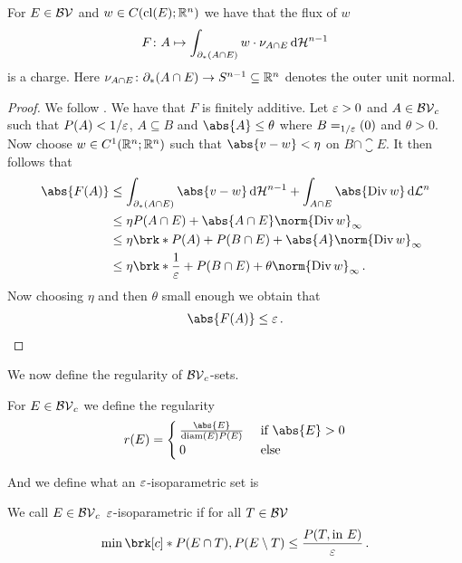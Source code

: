 \begin{claim}
For $E\in\mathcal{BV}$  and $w\in C(\operatorname{cl}(E);\mathbb{R}^n)$ we have that the flux of $w$
\begin{align*}
	F\colon A\mapsto \int_{\partial_*(A\cap E)}w\cdot\nu_{A\cap E}\,\mathrm{d} \mathcal{H}^{n-1}
\end{align*}
is a charge. Here $\nu_{A\cap E}\colon \partial_*(A\cap E)\to S^{n-1}\subseteq\mathbb{R}^n$ denotes the outer unit normal.
\end{claim}
\begin{proof}
We follow \cite[Example 2.1.4]{Pfe2001}.
We have that $F$ is finitely additive. Let $\varepsilon>0$ and $A\in\mathcal{BV}_c$ such that $P(A)<1/\varepsilon$, $A\subseteq B$ and $\abs{A}\leq \theta$ where $B=_{1/\varepsilon}(0)$ and $\theta>0$. Now choose $w\in C^1(\mathbb{R}^n;\mathbb{R}^n)$ such that $\abs{v-w}<\eta$ on $B\cap\closure E$. It then follows that
\begin{align*}
	\abs{F(A)}
	&\leq \int_{\partial_*(A\cap E)}\abs{v-w}\dif\cH^{n-1}+\int_{A\cap E}\abs{\diver w}\dif\cL^n \\
	&\leq \eta P(A\cap E)+\abs{A\cap E}\norm{\diver w}_\infty \\
	&\leq \eta \brk*{P(A)+P(B\cap E)}+\abs{A}\norm{\diver w}_\infty \\
	&\leq \eta\brk*{\frac{1}{\e}+P(B\cap E)}+\theta\norm{\diver w}_\infty\,.
\end{align*}
Now choosing $\eta$ and then $\theta$ small enough we obtain that
\begin{align*}
	\abs{F(A)}\leq \e\,.
\end{align*}
\end{proof}

We now define the regularity of $\mathcal{BV}_c$-sets.

\begin{definition}
For $E\in \mathcal{BV}_c$ we define the regularity
\begin{align*}
	r(E)=\begin{cases}
		\frac{\abs{E}}{\diam(E)P(E)} &\text{ if }\abs{E}>0 \\
		0 &\text{ else}
	\end{cases}
\end{align*}
\end{definition}

And we define what an $\e$-isoparametric set is

\begin{definition}[$\e$-isoparametric]
We call $E\in\mathcal{BV}_c$ $\e$-isoparametric if for all $T\in\mathcal{BV}$
\begin{align*}
	\min\brk[c]*{P(E\cap T),P(E\setminus T)}\leq \frac{P(T,\text{in }E)}{\e}\,.
\end{align*}
\end{definition}

